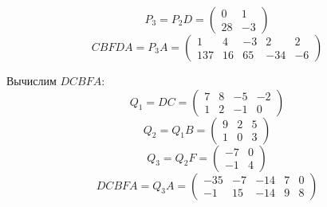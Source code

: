 \documentclass{article}
\begin{document}
$$P_3=P_2D=\left(\begin{array}{cc}0 & 1\\28 & -3\end{array}\right)$$
$$CBFDA=P_3A=\left(\begin{array}{ccccc}1 & 4 & -3 & 2 & 2\\137 & 16 & 65 & -34 & -6\end{array}\right)$$
\par
Вычислим $DCBFA$:
$$Q_1=DC=\left(\begin{array}{cccc}7 & 8 & -5 & -2\\1 & 2 & -1 & 0\end{array}\right)$$
$$Q_2=Q_1B=\left(\begin{array}{ccc}9 & 2 & 5\\1 & 0 & 3\end{array}\right)$$
$$Q_3=Q_2F=\left(\begin{array}{cc}-7 & 0\\-1 & 4\end{array}\right)$$
$$DCBFA=Q_3A=\left(\begin{array}{ccccc}-35 & -7 & -14 & 7 & 0\\-1 & 15 & -14 & 9 & 8\end{array}\right)$$
\end{document}
